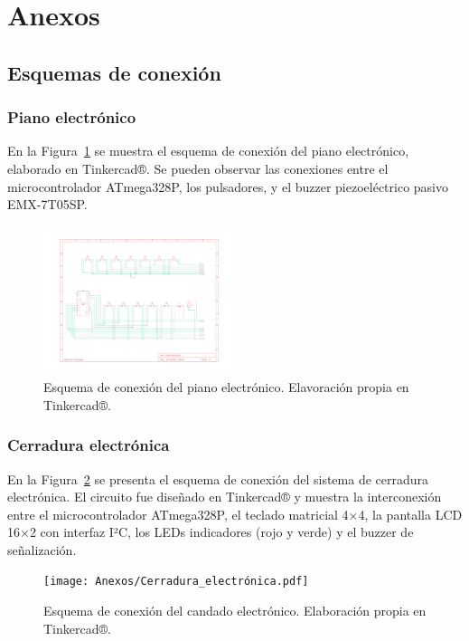 \newpage

\section{Anexos}

\subsection{Esquemas de conexión}

\subsubsection{Piano electrónico}

En la Figura~\ref{fig:conexion_piano} se muestra el esquema de conexión del piano electrónico, elaborado en Tinkercad®. 
Se pueden observar las conexiones entre el microcontrolador ATmega328P, los pulsadores, y el buzzer piezoeléctrico pasivo EMX-7T05SP.

\begin{figure}[H]
    \centering
    \includegraphics[width=0.5\textwidth]{Anexos/Conexionado_de_piano.pdf}
    \caption{Esquema de conexión del piano electrónico. Elavoración propia en Tinkercad®.}
    \label{fig:conexion_piano}
\end{figure}

\subsubsection{Cerradura electrónica}

En la Figura~\ref{fig:Cerradura_electronica} se presenta el esquema de conexión del sistema de cerradura electrónica. 
El circuito fue diseñado en Tinkercad® y muestra la interconexión entre el microcontrolador ATmega328P, el teclado matricial 4×4, 
la pantalla LCD 16×2 con interfaz I²C, los LEDs indicadores (rojo y verde) y el buzzer de señalización.

\begin{figure}[H]
    \centering
    \texttt{[image: Anexos/Cerradura\_electrónica.pdf]}
    \caption{Esquema de conexión del candado electrónico. Elaboración propia en Tinkercad®.}
    \label{fig:Cerradura_electronica}
\end{figure}

